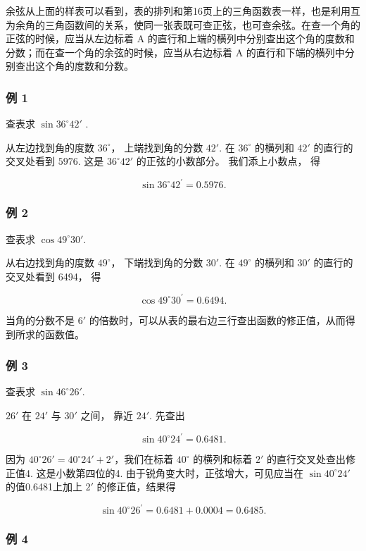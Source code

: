 余弦从上面的样表可以看到，表的排列和第16页上的三角函数表一样，也是利用互为余角的三角函数间的关系，使同一张表既可查正弦，也可查余弦。在查一个角的正弦的时候，应当从左边标着
A
的直行和上端的横列中分别查出这个角的度数和分数；而在查一个角的余弦的时候，应当从右边标着
A 的直行和下端的横列中分别查出这个角的度数和分数。

\subsubsection{例 1}

查表求 \(\sin 36^{\circ}42'\) .

 从左边找到角的度数 \(36^{\circ}\)， 上端找到角的分数
\(42'\). 在 \(36^{\circ}\) 的横列和 \(42'\) 的直行的交叉处看到 \(5976\).
这是 \(36^{\circ}42'\) 的正弦的小数部分。 我们添上小数点， 得

\[
\sin 36 ^{\circ} 42 ^{\prime} = 0.5976.
\]

\subsubsection{例 2}

查表求 \(\cos 49^{\circ}30'\).

 从右边找到角的度数 \(49^{\circ}\)， 下端找到角的分数
\(30'\). 在 \(49^{\circ}\) 的横列和 \(30'\) 的直行的交叉处看到 6494， 得

\[
\cos 49 ^{\circ} 30 ^{\prime} = 0.6494.
\]

当角的分数不是 \(6'\)
的倍数时，可以从表的最右边三行查出函数的修正值，从而得到所求的函数值。

\subsubsection{例 3}

查表求 \(\sin 46^{\circ}26'\).

 \(26'\) 在 \(24'\) 与 \(30'\) 之间， 靠近 \(24'\).
先查出

\[
\sin 40 ^{\circ} 24 ^{\prime} = 0.6481.
\]

因为 \(40^{\circ}26' = 40^{\circ}24' + 2'\)，我们在标着 \(40^{\circ}\)
的横列和标着 \(2'\) 的直行交叉处查出修正值4. 这是小数第四位的4.
由于锐角变大时，正弦增大，可见应当在 \(\sin 40^{\circ}24'\)
的值0.6481上加上 \(2'\) 的修正值，结果得

\[
\sin 40 ^{\circ} 26 ^{\prime} = 0.6481 + 0.0004 = 0.6485.
\]

\subsubsection{例 4}

